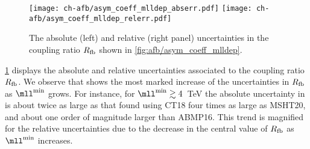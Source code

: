 \begin{figure}[!t]
 \centering
 \texttt{[image: ch-afb/asym\_coeff\_mlldep\_abserr.pdf]}
 \texttt{[image: ch-afb/asym\_coeff\_mlldep\_relerr.pdf]}
 \caption{The absolute (left) and relative (right panel) uncertainties
   in the coupling ratio $R_{\rm fb}$ shown in \cref{fig:afb/asym_coeff_mlldep}.
 }    
 \label{fig:afb/asym_coeff_mlldep_err}
\end{figure}

\cref{fig:afb/asym_coeff_mlldep_err} displays the 
absolute  and relative  uncertainties
associated to the coupling ratio $R_{\rm fb}$.
%
We observe that  shows
the most marked increase of the uncertainties in $R_{\rm fb}$
as $\mll^{\rm min}$ grows.
%
For instance, for  $\mll^{\rm min}\gtrsim4$~TeV
the absolute \pdf uncertainty in 
is about twice as large as that found using CT18 
four times as large as MSHT20,
and about one order of magnitude larger than ABMP16.
%
This trend is magnified for the relative uncertainties
due to the decrease in the central value of $R_{\rm fb}$
as $\mll^{\rm min}$ increases.

